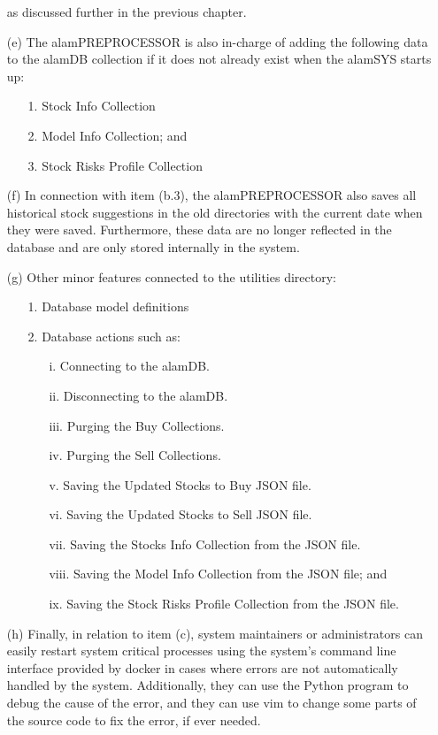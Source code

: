 \begin{itemize}
    as discussed further in the previous chapter.
    \item[(e)] The alamPREPROCESSOR is also in-charge of adding the following data to the alamDB collection if 
    it does not already exist when the alamSYS starts up:
    \begin{itemize}
        \item[1.] Stock Info Collection
        \item[2.] Model Info Collection; and
        \item[3.] Stock Risks Profile Collection
    \end{itemize}
    \item[(f)] In connection with item (b.3), the alamPREPROCESSOR also saves all historical stock suggestions in 
    the old directories with the current date when they were saved. Furthermore, these data are no longer reflected in 
    the database and are only stored internally in the system.
    \item[(g)] Other minor features connected to the utilities directory:
    \begin{itemize}
        \item[1.] Database model definitions
        \item[2.] Database actions such as:
        \begin{itemize}
            \item[i.] Connecting to the alamDB.
            \item[ii.] Disconnecting to the alamDB.
            \item[iii.] Purging the Buy Collections.
            \item[iv.] Purging the Sell Collections.
            \item[v.] Saving the Updated Stocks to Buy JSON file.
            \item[vi.] Saving the Updated Stocks to Sell JSON file.
            \item[vii.] Saving the Stocks Info Collection from the JSON file.
            \item[viii.] Saving the Model Info Collection from the JSON file; and
            \item[ix.] Saving the Stock Risks Profile Collection from the JSON file.
        \end{itemize} 
    \end{itemize}
    \item[(h)] Finally, in relation to item (c), system maintainers or administrators can easily restart system critical 
    processes using the system's command line interface provided by docker in cases where errors are not automatically 
    handled by the system. Additionally, they can use the Python program to debug the cause of the error, and they can 
    use vim to change some parts of the source code to fix the error, if ever needed.
\end{itemize}

